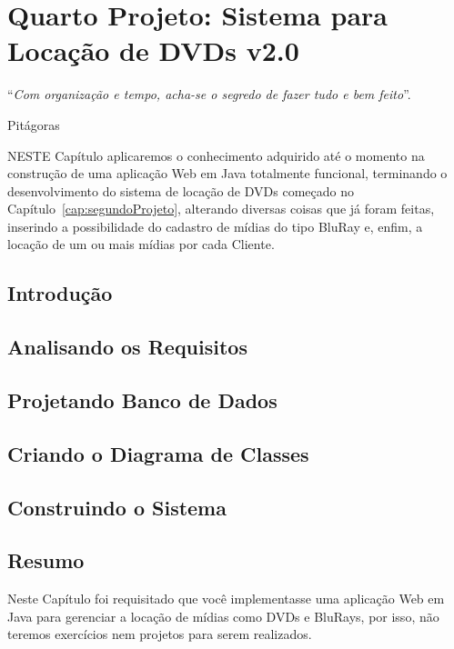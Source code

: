 \chapter{Quarto Projeto: Sistema para Locação de DVDs v2.0}\label{cap:quartoProjeto}
\epigraph{``\textit{Com organização e tempo, acha-se o segredo de fazer tudo e bem feito}''.}{Pitágoras}

\lettrine[lines=4, lhang=0.1, lraise=0, loversize=0.2, findent=0.1em]{\textcolor{corAzulTema}{N}}{ESTE} Capítulo aplicaremos o conhecimento adquirido até o momento na construção de uma aplicação Web em Java totalmente funcional, terminando o desenvolvimento do sistema de locação de DVDs começado no Capítulo~\ref{cap:segundoProjeto}, alterando diversas coisas que já foram feitas, inserindo a possibilidade do cadastro de mídias do tipo BluRay e, enfim, a locação de um ou mais mídias por cada Cliente.

\section{Introdução}

\section{Analisando os Requisitos}

\section{Projetando Banco de Dados}

\section{Criando o Diagrama de Classes}

\section{Construindo o Sistema}

\section{Resumo}

Neste Capítulo foi requisitado que você implementasse uma aplicação Web em Java para gerenciar a locação de mídias como DVDs e BluRays, por isso, não teremos exercícios nem projetos para serem realizados. 
